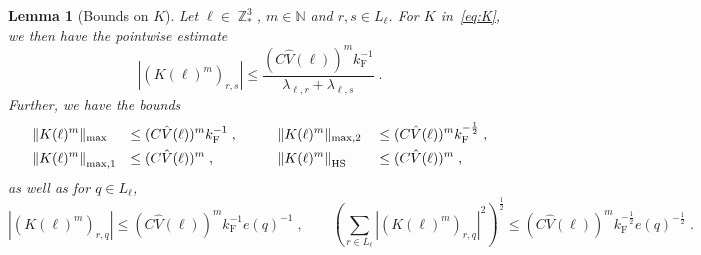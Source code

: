 \documentclass[12pt,a4paper]{article}
\numberwithin{equation}{section}
\newcommand{\1}{\mathbb{I}}
\newcommand{\F}{\mathrm{F}}
\newcommand{\HS}{\mathrm{HS}}
\DeclareMathOperator{\Z}{\mathbb{Z}}
\newcommand{\half}{\frac{1}{2}}
\newcommand{\normmaxi}[1]{\norm{#1}_{\mathrm{max,1}}}
\theoremstyle{plain}
\newtheorem{lemma}[theorem]{Lemma}
\theoremstyle{definition}
\theoremstyle{remark}
\theoremstyle{plain}
\theoremstyle{definition}
\theoremstyle{remark}
\begin{document}
\begin{lemma}[Bounds on $ K $]\label{lem:normsk}
Let $ \ell \in \Z^3_* $, $ m \in \mathbb{N} $ and $ r,s \in L_\ell $. For $ K $ in~\eqref{eq:K}, we then have the pointwise estimate
\begin{equation} \label{eq:K_element_bounds}
	|(K(\ell)^m)_{r,s}|
	\le \frac{(C \hat{V}(\ell))^m k_{\F}^{-1}}{\lambda_{\ell,r} + \lambda_{\ell,s}} \;.
\end{equation}
Further, we have the bounds
\begin{equation} \label{eq:K_max_bounds}
\begin{aligned}
	&\Vert K(\ell)^m \Vert_{\max}
	&\le \; &(C \hat{V}(\ell))^m k_{\F}^{-1} \;, \qquad
	&&\Vert K(\ell)^m \Vert_{\max,2}
	&&\le (C \hat{V}(\ell))^m k_{\F}^{-\half} \;, \\
	&\normmaxi{K(\ell)^m}
	&\le \; &(C \hat{V}(\ell))^m \;, \qquad
	&&\norm{K(\ell)^m}_{\HS}
	&&\le (C \hat{V}(\ell))^m \;,
\end{aligned} 
\end{equation}
as well as for $ q \in L_\ell $,
\begin{equation} \label{eq:e(q)_extraction_bounds}
	|(K(\ell)^m)_{r,q}|
	\le (C \hat{V}(\ell))^m k_{\F}^{-1} e(q)^{-1} \;, \qquad
	\left( \sum_{r \in L_\ell} |(K(\ell)^m)_{r,q}|^2 \right)^{\half}
	\le (C \hat{V}(\ell))^m k_{\F}^{-\half} e(q)^{-\half} \;.
\end{equation}
\end{lemma}
\end{document}
